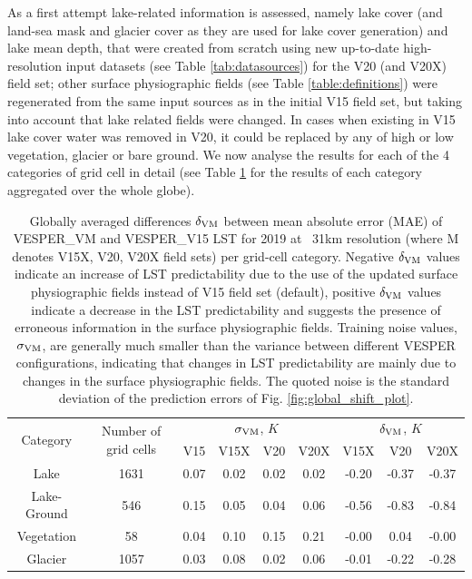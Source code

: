 \documentclass[hess, twostagejnl]{copernicus}
\begin{document}
\noindent As a first attempt lake-related information is assessed, namely lake cover (and land-sea mask and glacier cover as they are used for lake cover generation) and lake mean depth, that were created from scratch using new up-to-date high-resolution input datasets (see Table \ref{tab:datasources}) for the V20 (and V20X) field set; other surface physiographic fields (see Table \ref{table:definitions}) were regenerated from the same input sources as in the initial V15 field set, but taking into account that lake related fields were changed. In cases when existing in V15 lake cover water was removed in V20, it could be replaced by any of high or low vegetation, glacier or bare ground. We now analyse the results for each of the 4 categories of grid cell in detail (see Table \ref{tab:categorisation} for the results of each category aggregated over the whole globe).
\begin{table}
	\begin{tabular}{ccccccccc}
		\toprule
		\multirow{2}{*}{Category} & \multirow{2}{*}{Number of grid cells} & 	\multicolumn{4}{c}{$\sigma_{\rm VM}$, $K$} &\multicolumn{3}{c}{$\delta_{\rm VM}$, $K$} \\  
		&&V15  & V15X & V20 & V20X & V15X &V20 & V20X  \\
		\hline 
		Lake&1631 & 0.07& 0.02& 0.02& 0.02&  -0.20 & -0.37&-0.37 \\
		Lake-Ground&546 & 0.15 &0.05& 0.04& 0.06 & -0.56 &-0.83& -0.84 \\
		Vegetation&58 & 0.04 &0.10& 0.15& 0.21&  -0.00&0.04 & -0.00 \\
		Glacier&1057 & 0.03& 0.08& 0.02& 0.06 & -0.01& -0.22& -0.28  \\
		\bottomrule
	\end{tabular}
	\caption{Globally averaged differences $\delta_{\rm VM}$ between mean absolute error (MAE) of VESPER\_VM  and VESPER\_V15 LST for 2019 at ~31km resolution (where M denotes V15X, V20, V20X field sets) per grid-cell category. Negative $\delta_{\rm VM}$ values indicate an increase of LST predictability due to the use of the updated surface physiographic fields instead of V15 field set (default), positive $\delta_{\rm VM}$ values indicate a decrease in the LST predictability and suggests the presence of erroneous information in the surface physiographic fields. Training noise values, $\sigma_{\rm VM}$, are generally much smaller than the variance between different VESPER configurations, indicating that changes in LST predictability are mainly due to changes in the surface physiographic fields. The quoted noise is the standard deviation of the prediction errors of Fig. \ref{fig:global_shift_plot}.}
	\label{tab:categorisation}
\end{table}	
\end{document}
